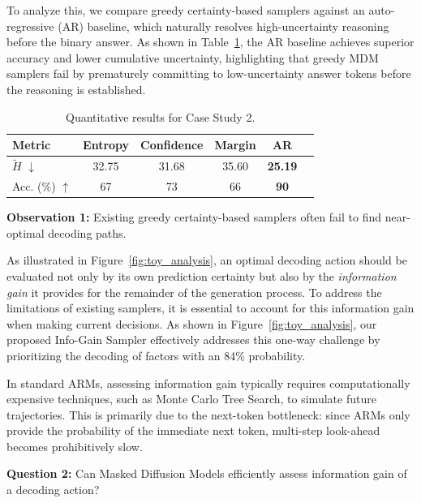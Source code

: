 To analyze this, we compare greedy certainty-based samplers against an auto-regressive (AR) baseline, which naturally resolves high-uncertainty reasoning before the binary answer. As shown in Table~\ref{tab:toy_experiment_2}, the AR baseline achieves superior accuracy and lower cumulative uncertainty, highlighting that greedy MDM samplers fail by prematurely committing to low-uncertainty answer tokens before the reasoning is established. 
\begin{table}[h]
\centering
\caption{Quantitative results for Case Study 2.}
\label{tab:toy_experiment_2}
\small
\setlength{\tabcolsep}{3pt}
\begin{tabular}{@{}lccccc@{}}
\toprule
\textbf{Metric} & {Entropy} & {Confidence} & {Margin} & {AR} \\ \midrule
$\tilde{H}$ $\downarrow$ & 32.75 & 31.68 & 35.60 & \textbf{25.19} \\
Acc. (\%) $\uparrow$ & 67 & 73 & 66 & \textbf{90} \\ \bottomrule
\end{tabular}
\end{table}

\begin{observationbox}
\textbf{Observation 1:}\label{obs:obs1}
Existing greedy certainty-based samplers often fail to find near-optimal decoding paths.
\end{observationbox}

As illustrated in Figure~\ref{fig:toy_analysis}, an optimal decoding action should be evaluated not only by its own prediction certainty but also by the \textit{information gain} it provides for the remainder of the generation process. To address the limitations of existing samplers, it is essential to account for this information gain when making current decisions. As shown in Figure~\ref{fig:toy_analysis}, our proposed Info-Gain Sampler effectively addresses this one-way challenge by prioritizing the decoding of factors with an 84\% probability.

In standard ARMs, assessing information gain typically requires computationally expensive techniques, such as Monte Carlo Tree Search, to simulate future trajectories. This is primarily due to the next-token bottleneck: since ARMs only provide the probability of the immediate next token, multi-step look-ahead becomes prohibitively slow.

\begin{observationbox}
\textbf{Question 2:}
Can Masked Diffusion Models efficiently assess information gain of a decoding action?
\end{observationbox}


